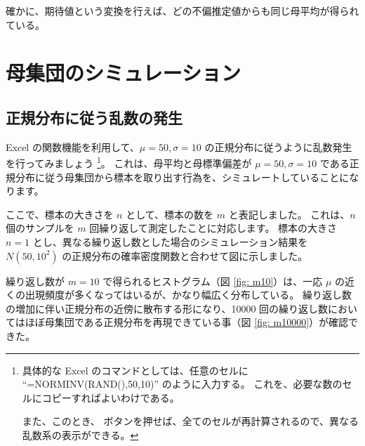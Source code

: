 \documentclass[uplatex,11pt,a4paper]{jsarticle}
\begin{document}
確かに、期待値という変換を行えば、どの不偏推定値からも同じ母平均が得られている。

\newpage

\section{母集団のシミュレーション}

\subsection{正規分布に従う乱数の発生}

Excel の関数機能を利用して、$\mu = 50, \sigma = 10$ の正規分布に従うように乱数発生を行ってみましょう
\footnote
{
具体的な Excel のコマンドとしては、任意のセルに ``=NORMINV(RAND(),50,10)'' のように入力する。
これを、必要な数のセルにコピーすればよいわけである。

また、このとき、 ボタンを押せば、全てのセルが再計算されるので、異なる乱数系の表示ができる。
}。
これは、母平均と母標準偏差が $\mu = 50, \sigma = 10$ である正規分布に従う母集団から標本を取り出す行為を、シミュレートしていることになります。

ここで、標本の大きさを $n$ として、標本の数を $m$ と表記しました。
これは、$n$ 個のサンプルを $m$ 回繰り返して測定したことに対応します。
標本の大きさ $n=1 $ とし、異なる繰り返し数とした場合のシミュレーション結果を  $N(50, 10^2)$ の正規分布の確率密度関数と合わせて図に示しました。

繰り返し数が $m=10$ で得られるヒストグラム（図 \ref{fig: m10}）は、一応 $\mu$ の近くの出現頻度が多くなってはいるが、かなり幅広く分布している。
繰り返し数の増加に伴い正規分布の近傍に散布する形になり、10000 回の繰り返し数においてはほぼ母集団である正規分布を再現できている事（図 \ref{fig: m10000}）が確認できた。
\end{document}
